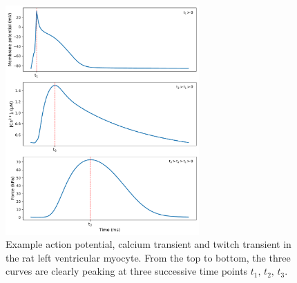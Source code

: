 \begin{figure}[!ht]
    \myfloatalign
    \includegraphics[width=0.66\textwidth]{figures/chapter01/three_peaks.pdf}
    \caption{Example action potential, calcium transient and twitch transient in the rat left ventricular myocyte. From the top to bottom, the three curves are clearly peaking at three successive time points $t_1,\,t_2,\,t_3$.}
    \label{fig:my_label1}
\end{figure}




